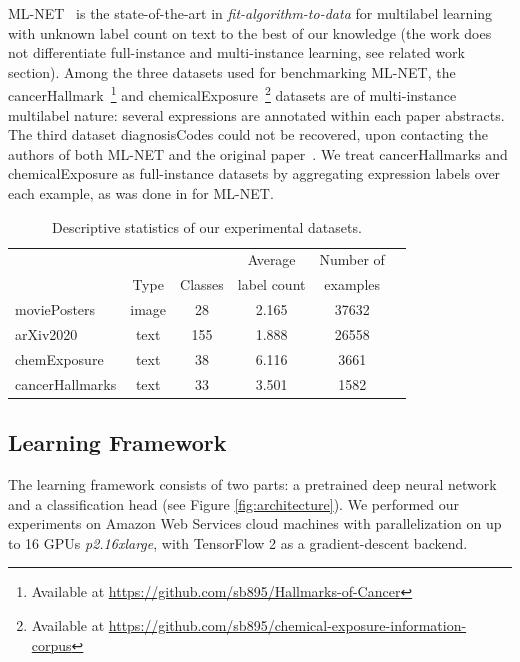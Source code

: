 ML-NET~\cite{multitaskLabel} is the state-of-the-art in \emph{fit-algorithm-to-data} for multilabel learning with unknown label count on text to the best of our knowledge (the work does not differentiate full-instance and multi-instance learning, see related work section). Among the three datasets used for benchmarking ML-NET, the cancerHallmark~\cite{cancerHallmarks}\footnote{Available at \url{https://github.com/sb895/Hallmarks-of-Cancer}} and chemicalExposure~\cite{chemExposure}\footnote{Available at \url{https://github.com/sb895/chemical-exposure-information-corpus}} datasets are of multi-instance multilabel nature: several expressions are annotated within each paper abstracts. The third dataset diagnosisCodes could not be recovered, upon contacting the authors of both ML-NET and the original paper~\cite{diagnosisCode}. We treat cancerHallmarks and chemicalExposure as full-instance datasets by aggregating expression labels over each example, as was done in for ML-NET.

\begin{table}
\caption{Descriptive statistics of our experimental datasets.}
\label{table:datasets}
\centering
\begin{tabular}{l ccccc}
\toprule
& & & Average & Number of \\
& Type & Classes & label count & examples \\
\midrule
moviePosters & image & 28 & 2.165 & 37632\\
arXiv2020 & text & 155 & 1.888 & 26558\\ 
chemExposure & text & 38 & 6.116 & 3661\\
cancerHallmarks\hspace{-.7em}  & text & 33 & 3.501 & 1582\\
\bottomrule
\end{tabular}
\end{table}

\subsection{Learning Framework}

The learning framework consists of two parts: a pretrained deep neural network and a classification head (see Figure \ref{fig:architecture}). We performed our experiments on Amazon Web Services cloud machines with parallelization on up to 16 GPUs \textit{p2.16xlarge}, with TensorFlow 2 as a gradient-descent backend.

